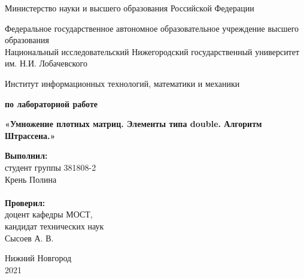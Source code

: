 \documentclass{report}
\begin{document}
\begin{titlepage}

\begin{center}
Министерство науки и высшего образования Российской Федерации
\end{center}

\begin{center}
Федеральное государственное автономное образовательное учреждение высшего образования \\
Национальный исследовательский Нижегородский государственный университет им. Н.И. Лобачевского
\end{center}

\begin{center}
Институт информационных технологий, математики и механики
\end{center}

\vspace{4em}

\begin{center}
\textbf{ по лабораторной работе} \\
\end{center}
\begin{center}
\textbf{\Large«Умножение плотных матриц. Элементы типа double. Алгоритм Штрассена.»} \\
\end{center}

\vspace{4em}

\newbox{\lbox}
\newlength{\maxl}
\setlength{\maxl}{\wd\lbox}
\hfill\parbox{7cm}{
\hspace*{5cm}\hspace*{-5cm}\textbf{Выполнил:} \\ студент группы 381808-2 \\ Крень Полина\\
\\
\hspace*{5cm}\hspace*{-5cm}\textbf{Проверил:}\\ доцент кафедры МОСТ, \\ кандидат технических наук \\ Сысоев А. В.\\
}
\vspace{\fill}

\begin{center} 
Нижний Новгород \\ 2021 
\end{center}
\end{titlepage}
\end{document}
